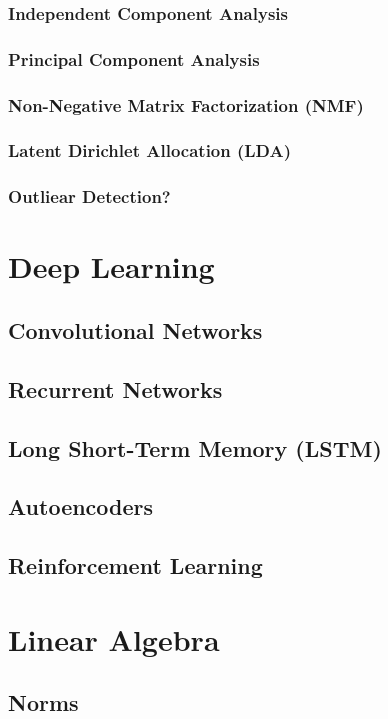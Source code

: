 \documentclass[11pt]{article}
\begin{document}
\subsubsection{Independent Component Analysis}
\subsubsection{Principal Component Analysis}
\subsubsection{Non-Negative Matrix Factorization (NMF)}
\subsubsection{Latent Dirichlet Allocation (LDA)}
\subsubsection{Outliear Detection?}

\section{Deep Learning}
\subsection{Convolutional Networks}
\subsection{Recurrent Networks}
\subsection{Long Short-Term Memory (LSTM)}
\subsection{Autoencoders}
\subsection{Reinforcement Learning}

\section{Linear Algebra}
\subsection{Norms}
\end{document}
